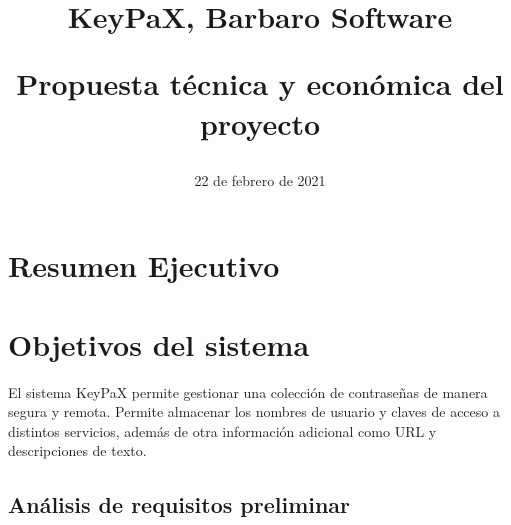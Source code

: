 \documentclass{article}
\title{
\Huge{KeyPaX, Barbaro Software} \\ 
\begin{Large} 
Propuesta técnica y económica    del proyecto
\end{Large}}
\date{22 de febrero de 2021}
\begin{document}
\maketitle

\pagebreak 

\tableofcontents

\pagebreak

\section{Resumen Ejecutivo}


\pagebreak

\section{Objetivos del sistema}


El sistema KeyPaX permite gestionar una colección de contraseñas de manera segura y remota. Permite almacenar los nombres de usuario y claves de acceso a distintos servicios, además de otra información adicional como URL y descripciones de texto. 

\subsection{Análisis de requisitos preliminar}


\end{document}
